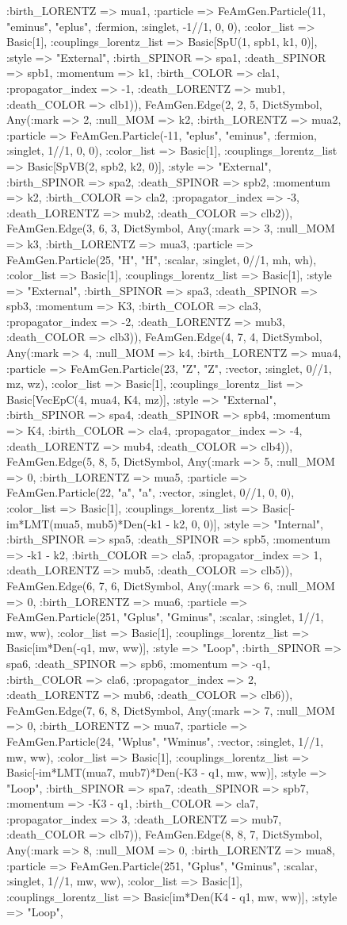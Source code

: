 \documentclass{revtex4}
\begin{document}
\begin{figure}[!htb]
\begin{center}
{:birth_LORENTZ => mua1, :particle => FeAmGen.Particle(11, "eminus", "eplus", :fermion, :singlet, -1//1, 0, 0), :color_list => Basic[1], :couplings_lorentz_list => Basic[SpU(1, spb1, k1, 0)], :style => "External", :birth_SPINOR => spa1, :death_SPINOR => spb1, :momentum => k1, :birth_COLOR => cla1, :propagator_index => -1, :death_LORENTZ => mub1, :death_COLOR => clb1)), FeAmGen.Edge(2, 2, 5, Dict{Symbol, Any}(:mark => 2, :null_MOM => k2, :birth_LORENTZ => mua2, :particle => FeAmGen.Particle(-11, "eplus", "eminus", :fermion, :singlet, 1//1, 0, 0), :color_list => Basic[1], :couplings_lorentz_list => Basic[SpVB(2, spb2, k2, 0)], :style => "External", :birth_SPINOR => spa2, :death_SPINOR => spb2, :momentum => k2, :birth_COLOR => cla2, :propagator_index => -3, :death_LORENTZ => mub2, :death_COLOR => clb2)), FeAmGen.Edge(3, 6, 3, Dict{Symbol, Any}(:mark => 3, :null_MOM => k3, :birth_LORENTZ => mua3, :particle => FeAmGen.Particle(25, "H", "H", :scalar, :singlet, 0//1, mh, wh), :color_list => Basic[1], :couplings_lorentz_list => Basic[1], :style => "External", :birth_SPINOR => spa3, :death_SPINOR => spb3, :momentum => K3, :birth_COLOR => cla3, :propagator_index => -2, :death_LORENTZ => mub3, :death_COLOR => clb3)), FeAmGen.Edge(4, 7, 4, Dict{Symbol, Any}(:mark => 4, :null_MOM => k4, :birth_LORENTZ => mua4, :particle => FeAmGen.Particle(23, "Z", "Z", :vector, :singlet, 0//1, mz, wz), :color_list => Basic[1], :couplings_lorentz_list => Basic[VecEpC(4, mua4, K4, mz)], :style => "External", :birth_SPINOR => spa4, :death_SPINOR => spb4, :momentum => K4, :birth_COLOR => cla4, :propagator_index => -4, :death_LORENTZ => mub4, :death_COLOR => clb4)), FeAmGen.Edge(5, 8, 5, Dict{Symbol, Any}(:mark => 5, :null_MOM => 0, :birth_LORENTZ => mua5, :particle => FeAmGen.Particle(22, "a", "a", :vector, :singlet, 0//1, 0, 0), :color_list => Basic[1], :couplings_lorentz_list => Basic[-im*LMT(mua5, mub5)*Den(-k1 - k2, 0, 0)], :style => "Internal", :birth_SPINOR => spa5, :death_SPINOR => spb5, :momentum => -k1 - k2, :birth_COLOR => cla5, :propagator_index => 1, :death_LORENTZ => mub5, :death_COLOR => clb5)), FeAmGen.Edge(6, 7, 6, Dict{Symbol, Any}(:mark => 6, :null_MOM => 0, :birth_LORENTZ => mua6, :particle => FeAmGen.Particle(251, "Gplus", "Gminus", :scalar, :singlet, 1//1, mw, ww), :color_list => Basic[1], :couplings_lorentz_list => Basic[im*Den(-q1, mw, ww)], :style => "Loop", :birth_SPINOR => spa6, :death_SPINOR => spb6, :momentum => -q1, :birth_COLOR => cla6, :propagator_index => 2, :death_LORENTZ => mub6, :death_COLOR => clb6)), FeAmGen.Edge(7, 6, 8, Dict{Symbol, Any}(:mark => 7, :null_MOM => 0, :birth_LORENTZ => mua7, :particle => FeAmGen.Particle(24, "Wplus", "Wminus", :vector, :singlet, 1//1, mw, ww), :color_list => Basic[1], :couplings_lorentz_list => Basic[-im*LMT(mua7, mub7)*Den(-K3 - q1, mw, ww)], :style => "Loop", :birth_SPINOR => spa7, :death_SPINOR => spb7, :momentum => -K3 - q1, :birth_COLOR => cla7, :propagator_index => 3, :death_LORENTZ => mub7, :death_COLOR => clb7)), FeAmGen.Edge(8, 8, 7, Dict{Symbol, Any}(:mark => 8, :null_MOM => 0, :birth_LORENTZ => mua8, :particle => FeAmGen.Particle(251, "Gplus", "Gminus", :scalar, :singlet, 1//1, mw, ww), :color_list => Basic[1], :couplings_lorentz_list => Basic[im*Den(K4 - q1, mw, ww)], :style => "Loop", }
\end{center}
\end{figure}
\end{document}
